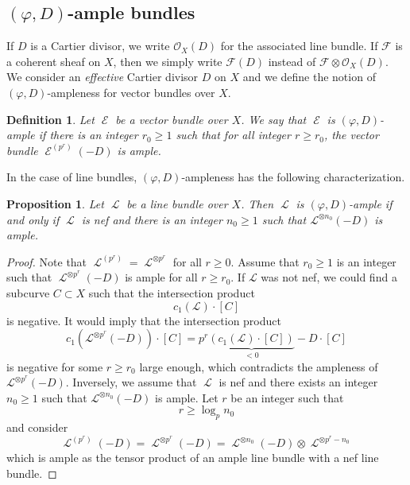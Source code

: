 \documentclass[11pt]{amsart}
\numberwithin{subsection}{section}
\numberwithin{figure}{section}
\numberwithin{table}{section}
\theoremstyle{1}
\newtheorem{proposition}[theorem]{Proposition}
\newtheorem{definition}[theorem]{Definition}
\theoremstyle{2}
\DeclareMathOperator{\Lc}{\mathcal{L}}
\DeclareMathOperator{\E}{\mathcal{E}}
\begin{document}
\subsection{$(\varphi,D)$-ample bundles}\label{sect1}
If $D$ is a Cartier divisor, we write $\mathcal{O}_X(D)$ for the associated line bundle. If $\mathcal{F}$ is a coherent sheaf on $X$, then we simply write $\mathcal{F}(D)$ instead of $\mathcal{F}\otimes \mathcal{O}_X(D)$. We consider an \emph{effective} Cartier divisor $D$ on $X$ and we define the notion of $(\varphi,D)$-ampleness for vector bundles over $X$.
\begin{definition}\label{def3}
Let $\E$ be a vector bundle over $X$. We say that $\E$ is $(\varphi,D)$-ample if there is an integer $r_0 \geq 1$ such that for all integer $r \geq r_0$, the vector bundle $\E^{(p^r)}(-D)$ is ample.
\end{definition}
\vspace*{0.2cm}
In the case of line bundles, $(\varphi,D)$-ampleness has the following characterization.
\begin{proposition}\label{D-amp}
Let $\Lc$ be a line bundle over $X$. Then $\Lc$ is $(\varphi,D)$-ample if and only if $\Lc$ is nef and there is an integer $n_0 \geq 1$ such that $\mathcal{L}^{\otimes n_0}(-D)$ is ample.
\end{proposition}
\begin{proof}
Note that $\Lc^{(p^r)} = \Lc^{\otimes p^r}$ for all $r \geq 0$. Assume that $r_0 \geq 1$ is an integer such that $\Lc^{\otimes p^r}(-D)$ is ample for all $r \geq r_0$. If $\mathcal{L}$ was not nef, we could find a subcurve $C \subset X$ such that the intersection product
\begin{equation*}
c_1(\mathcal{L})\cdot [C]
\end{equation*}
is negative. It would imply that the intersection product
\begin{equation*}
c_1(\mathcal{L}^{\otimes p^r}(-D)) \cdot [C] = p^r \underbrace{\left( c_1(\mathcal{L})\cdot [C]\right)}_{<0} - {D}\cdot [C]
\end{equation*}
is negative for some $r \geq r_0$ large enough, which contradicts the ampleness of $\mathcal{L}^{\otimes p^r}(-D)$. Inversely, we assume that $\Lc$ is nef and there exists an integer $n_0 \geq 1$ such that $\mathcal{L}^{\otimes n_0}(-D)$ is ample. Let $r$ be an integer such that
\begin{equation*}
r \geq \log_pn_0
\end{equation*}
and consider
\begin{equation*}
\Lc^{(p^r)}(-D) = \Lc^{\otimes p^r}(-D) = \Lc^{\otimes n_0}(-D) \otimes \Lc^{\otimes p^r-n_0}
\end{equation*}
which is ample as the tensor product of an ample line bundle with a nef line bundle.
\end{proof}
\end{document}
